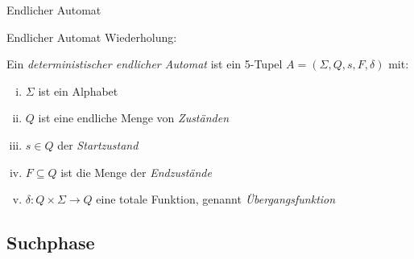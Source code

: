 \documentclass[xcolor=dvipsnames, aspectratio=1610]{beamer}
\begin{document}
\begin{frame}{Endlicher Automat}

\end{frame}

\begin{frame}{Endlicher Automat}
Wiederholung:\medskip

\begin{defi}
Ein \emph{deterministischer endlicher Automat} ist ein 5-Tupel $A=(\Sigma, Q, s, F, \delta)$ mit:
\begin{enumerate}[(i)]
\item $\Sigma$ ist ein Alphabet
\item $Q$ ist eine endliche Menge von \emph{Zuständen}
\item $s\in Q$ der \emph{Startzustand}
\item $F\subseteq Q$ ist die Menge der \emph{Endzustände} 
\item $\delta\colon Q\times\Sigma\to Q$ eine totale Funktion, genannt \emph{Übergangsfunktion}
\end{enumerate}
\end{defi}
\end{frame}

\subsection{Suchphase}
\end{document}
